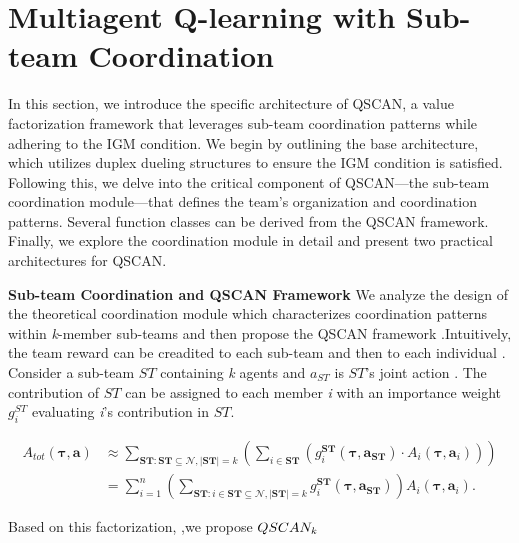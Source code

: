 \section{\textbf{Multiagent Q-learning with Sub-team Coordination}}
    In this section, we introduce the specific architecture of QSCAN, a value factorization framework that leverages sub-team coordination patterns while adhering to the IGM condition. We begin by outlining the base architecture, which utilizes duplex dueling structures \cite{r10} to ensure the IGM condition is satisfied. Following this, we delve into the critical component of QSCAN—the sub-team coordination module—that defines the team's organization and coordination patterns. Several function classes can be derived from the QSCAN framework. Finally, we explore the coordination module in detail and present two practical architectures for QSCAN.

    \textbf{Sub-team Coordination and QSCAN Framework}
    We analyze the design of the theoretical coordination module which characterizes coordination patterns within \emph{k}-member sub-teams and then propose the \large{QSCAN} framework .Intuitively, the team reward can be creadited to each sub-team and then to each individual . Consider a sub-team $ST$ containing \emph{k} agents and $a_{ST}$ is $ST$'s joint action . The contribution of $ST$ can be assigned to each member \emph{i} with an importance weight $g_{i}^{ST}$ evaluating \emph{i}'s contribution in $ ST$.


    \begin{align}
        A_{tot}(\mathbf{\tau}, \mathbf{a})
        & \approx \sum_{\mathbf{ST} : \mathbf{ST} \subseteq \mathcal{N}, |\mathbf{ST}| = k}
        \left( \sum_{i \in \mathbf{ST}} \left( g_i^{\mathbf{ST}}(\mathbf{\tau}, \mathbf{a}_{\mathbf{ST}})
        \cdot A_i(\mathbf{\tau}, \mathbf{a}_i) \right) \right) \nonumber \\
        & = \sum_{i=1}^{n} \left( \sum_{\mathbf{ST} : i \in \mathbf{ST}
        \subseteq \mathcal{N}, |\mathbf{ST}| = k} g_i^{\mathbf{ST}}(\mathbf{\tau}, \mathbf{a}_{\mathbf{ST}})
        \right) A_i(\mathbf{\tau}, \mathbf{a}_i). \nonumber
    \end{align}

    Based on this factorization, ,we propose \large{$QSCAN_{\emph{k}}$}
